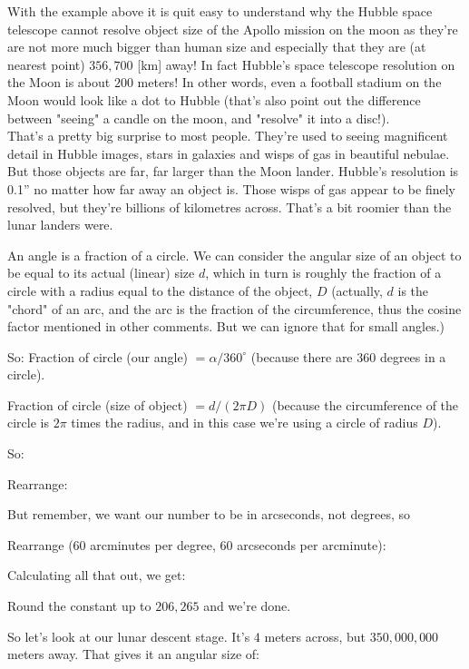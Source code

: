 	\begin{tcolorbox}[title=Remark,colframe=black,arc=10pt]
	With the example above it is quit easy to understand why the Hubble space telescope cannot resolve object size of the Apollo mission on the moon as they're are not more much bigger than human size and especially that they are (at nearest point) $356,700$ [km] away! In fact Hubble's space telescope resolution on the Moon is about $200$ meters! In other words, even a football stadium on the Moon would look like a dot to Hubble (that's also point out the difference between "seeing" a candle on the moon, and "resolve" it into a disc!).\\
	
	That's a pretty big surprise to most people. They're used to seeing magnificent detail in Hubble images, stars in galaxies and wisps of gas in beautiful nebulae. But those objects are far, far larger than the Moon lander. Hubble's resolution is 0.1'' no matter how far away an object is. Those wisps of gas appear to be finely resolved, but they're billions of kilometres across. That's a bit roomier than the lunar landers were.
	\end{tcolorbox}
	
	An angle is a fraction of a circle. We can consider the angular size of an object to be equal to its actual (linear) size $d$, which in turn is roughly the fraction of a circle with a radius equal to the distance of the object, $D$ (actually, $d$ is the "chord" of an arc, and the arc is the fraction of the circumference, thus the cosine factor mentioned in other comments. But we can ignore that for small angles.)

	So: Fraction of circle (our angle) $=\alpha/360^\circ$ (because there are $360$ degrees in a circle).
	
	Fraction of circle (size of object) $= d /(2\pi D)$ (because the circumference of the circle is $2\pi$ times the radius, and in this case we're using a circle of radius $D$).
	
	So:
	
	Rearrange:
	
	But remember, we want our number to be in arcseconds, not degrees, so
	
	Rearrange ($60$ arcminutes per degree, $60$ arcseconds per arcminute):
	
	Calculating all that out, we get:
	
	Round the constant up to $206,265$ and we're done.
	
	So let's look at our lunar descent stage. It's $4$ meters across, but $350,000,000$ meters away. That gives it an angular size of:
	
